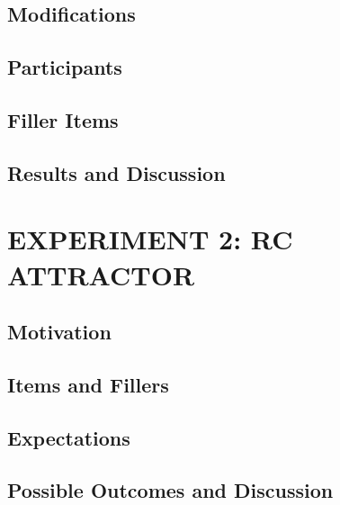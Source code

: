 \documentclass[11pt,a4paper]{article}
\begin{document}
\hypertarget{modifications}{%
\subsection{Modifications}\label{modifications}}

\hypertarget{participants}{%
\subsection{Participants}\label{participants}}

\hypertarget{filler-items}{%
\subsection{Filler Items}\label{filler-items}}

\hypertarget{results-and-discussion}{%
\subsection{Results and Discussion}\label{results-and-discussion}}

\hypertarget{experiment-2-rc-attractor}{%
\section{EXPERIMENT 2: RC ATTRACTOR}\label{experiment-2-rc-attractor}}

\hypertarget{motivation-1}{%
\subsection{Motivation}\label{motivation-1}}

\hypertarget{items-and-fillers}{%
\subsection{Items and Fillers}\label{items-and-fillers}}

\hypertarget{expectations}{%
\subsection{Expectations}\label{expectations}}

\hypertarget{possible-outcomes-and-discussion}{%
\subsection{Possible Outcomes and
Discussion}\label{possible-outcomes-and-discussion}}
\end{document}
